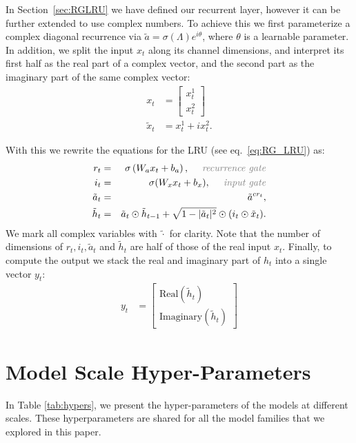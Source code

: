 \documentclass[11pt, a4paper, logo, onecolumn]{googledeepmind}
\theoremstyle{definition}
\begin{document}
In Section~\ref{sec:RGLRU} we have defined our recurrent layer, however it can be further extended to use complex numbers. 
To achieve this we first parameterize a complex diagonal recurrence via $\tilde{a} = \sigma(\Lambda) e^{i\theta}$, where $\theta$ is a learnable parameter. 
In addition, we split the input $x_t$ along its channel dimensions, and interpret its first half as the real part of a complex vector, and the second part as the imaginary part of the same complex vector:
\begin{eqnarray}
x_t &= \begin{bmatrix} x_t^1 \\ x_t^2 \end{bmatrix} \\
\tilde{x}_t &= x_t^1 + i x_t^2.
\end{eqnarray}

With this we rewrite the equations for the LRU (see eq.~\ref{eq:RG_LRU}) as:
\begin{eqnarray}
 r_t &=& \sigma\left(W_a x_t + b_a\right), \quad \textcolor{gray}{\text{ \emph{recurrence gate}}} \\
 i_t & = & \sigma(W_x x_t + b_x), \quad \textcolor{gray}{\text{\emph{ input gate}}} \\
\tilde{a}_t &=& \tilde{a}^{c r_t}, \\
\tilde{h}_{t} &=& \tilde{a}_t \odot \tilde{h}_{t-1} + \sqrt{1-|\tilde{a}_t|^2} \odot (i_t \odot \tilde{x}_t).
\end{eqnarray}
We mark all complex variables with $\tilde{\cdot}$ for clarity.
Note that the number of dimensions of $r_t, i_t, \tilde{a}_t$ and $\tilde{h}_t$ are half of those of the real input $x_t$.
Finally, to compute the output we stack the real and imaginary part of $h_t$ into a single vector $y_t$:
\begin{eqnarray}
y_t &= \begin{bmatrix} \text{Real}(\tilde{h}_t) \\ \text{Imaginary}(\tilde{h}_t) \end{bmatrix}
\end{eqnarray}

\section{Model Scale Hyper-Parameters} \label{appendix:model_scale_hparams}
In Table \ref{tab:hypers}, we present the hyper-parameters of the models at different scales. These hyperparameters are shared for all the model families that we explored in this paper.
\end{document}

